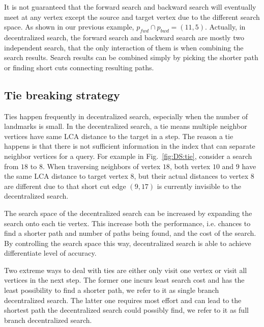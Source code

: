 It is not guaranteed that the forward search and backward search will eventually meet at any vertex except the source and target vertex due to the different search space. As shown in our previous example, $p_{fwd} \cap p_{bwd} = (11, 5)$. Actually, in decentralized search, the forward search and backward search are mostly two independent search, that the only interaction of them is when combining the search results. Search results can be combined simply by picking the shorter path or finding short cuts connecting resulting paths. 

\subsection{Tie breaking strategy}

Ties happen frequently in decentralized search, especially when the number of landmarks is small. In the decentralized search, a tie means multiple neighbor vertices have same LCA distance to the target in a step. The reason a tie happens is that there is not sufficient information in the index that can separate neighbor vertices for a query. For example in Fig.~\ref{fig:DS:tie}, consider a search from $18$ to $8$. When traversing neighbors of vertex $18$, both vertex $10$ and $9$ have the same LCA distance to target vertex $8$, but their actual distances to vertex $8$ are different due to that short cut edge $(9, 17)$ is currently invisible to the decentralized search. 

The search space of the decentralized search can be increased by expanding the search onto each tie vertex. This increase both the performance, i.e. chances to find a shorter path and number of paths being found, and the cost of the search. 
By controlling the search space this way, decentralized search is able to achieve differentiate level of accuracy. 

Two extreme ways to deal with ties are either only visit one vertex or visit all vertices in the next step. The former one incurs least search cost and has the least possibility to find a shorter path, we refer to it as single branch decentralized search. The latter one requires most effort and can lead to the shortest path the decentralized search could possibly find, we refer to it as full branch decentralized search. 
